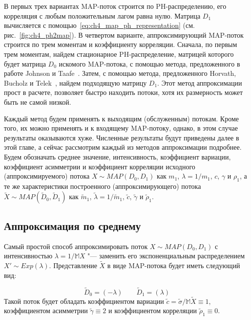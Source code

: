 В первых трех вариантах MAP-поток строится по PH-распределению, его корреляция с любым положительным лагом равна нулю. Матрица $D_1$ вычисляется с помощью~\eqref{eq:ch4_map_ph_representation} (см. рис.~\ref{fig:ch4_ph2map}). В четвертом варианте, аппроксимирующий MAP-поток строится по трем моментам и коэффициенту корреляции. Сначала, по первым трем моментам, найдем стационарное PH-распределение, матрицей которого будет матрица $D_0$ искомого MAP-потока, с помощью метода, предложенного в работе Johnson и Taafe~\cite{Johnson1989}. Затем, с помощью метода, предложенного Horvath, Bucholz и Telek~\cite{Horvath2005}, найдем подходящую матрицу $D_1$. Этот метод аппроксимации прост в расчете, позволяет быстро находить потоки, хотя их размерность может быть не самой низкой.

Каждый метод будем применять к выходящим (обслуженным) потокам. Кроме того, их можно применять и к входящему MAP-потоку, однако, в этом случае результаты оказываются хуже. Численные результаты будут приведены далее в этой главе, а сейчас рассмотрим каждый из методов аппроксимации подробнее. Будем обозначать среднее значение, интенсивность, коэффициент вариации, коэффициент асимметрии и коэффициент корреляции исходного (аппроксимируемого) потока $X \sim MAP(D_0, D_1)$ как $m_1$, $\lambda = 1/m_1$, $c$, $\gamma$ и $\rho_1$, а те же характеристики построенного (аппроксимирующего) потока $\tilde{X} \sim MAP(\tilde{D}_0, \tilde{D}_1)$ как $\tilde{m}_1$, $\tilde{\lambda} = 1/\tilde{m}_1$, $\tilde{c}$, $\tilde{\gamma}$ и $\tilde{\rho}_1$.



\subsection{Аппроксимация по среднему}\label{sec:ch4_approx_m1}

Самый простой способ аппроксимировать поток $X \sim MAP(D_0, D_1)$ с интенсивностью $\lambda = 1/\mathbb{M}X$ "--- заменить его экспоненциальным распределением $X' \sim Exp(\lambda)$. Представление $\tilde{X}$ в виде MAP-потока будет иметь следующий вид:

\begin{equation}
    \label{eq:ch4_map_from_exp}
    \tilde{D}_0 = \left( -\lambda \right) \qquad \tilde{D}_1 = \left( \lambda \right)
\end{equation}
Такой поток будет обладать коэффициентом вариации $\tilde{c} = \tilde{\sigma} / \mathbb{M}\tilde{X} \equiv 1$, коэффициентом асимметрии $\tilde{\gamma} \equiv 2$ и коэффициентом корреляции $\tilde{\rho}_1 \equiv 0$.

